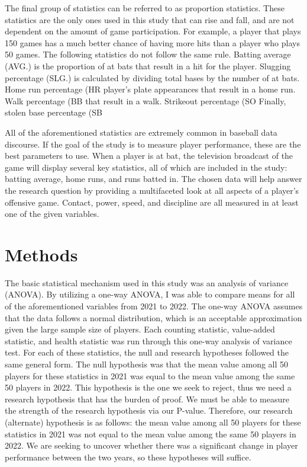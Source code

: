 \documentclass[10pt]{article}
\begin{document}
The final group of statistics can be referred to as proportion statistics. These statistics are the only ones used in this 
study that can rise and fall, and are not dependent on the amount of game participation. For example, a player that plays 150 
games has a much better chance of having more hits than a player who plays 50 games. The following statistics do not follow 
the same rule. Batting average (AVG.) is the proportion of at bats that result in a hit for the player. Slugging percentage 
(SLG.) is calculated by dividing total bases by the number of at bats. Home run percentage (HR%
player’s plate appearances that result in a home run. Walk percentage (BB%
that result in a walk. Strikeout percentage (SO%
Finally, stolen base percentage (SB%

All of the aforementioned statistics are extremely common in baseball data discourse. If the goal of the study is to measure 
player performance, these are the best parameters to use. When a player is at bat, the television broadcast of the game will 
display several key statistics, all of which are included in the study: batting average, home runs, and runs batted in. The 
chosen data will help answer the research question by providing a multifaceted look at all aspects of a player’s offensive 
game. Contact, power, speed, and discipline are all measured in at least one of the given variables.

\section{Methods}

The basic statistical mechanism used in this study was an analysis of variance (ANOVA). By utilizing a one-way ANOVA, I was able to 
compare means for all of the aforementioned variables from 2021 to 2022. The one-way ANOVA assumes that the data follows a 
normal distribution, which is an acceptable approximation given the large sample size of players. Each counting statistic, 
value-added statistic, and health statistic was run through this one-way analysis of variance test. For each of these 
statistics, the null and research hypotheses followed the same general form. The null hypothesis was that the mean value 
among all 50 players for these statistics in 2021 was equal to the mean value among the same 50 players in 2022. This 
hypothesis is the one we seek to reject, thus we need a research hypothesis that has the burden of proof. We must be able 
to measure the strength of the research hypothesis via our P-value. Therefore, our research (alternate) hypothesis is as 
follows: the mean value among all 50 players for these statistics in 2021 was not equal to the mean value among the same 50 
players in 2022. We are seeking to uncover whether there was a significant change in player performance between the two years, 
so these hypotheses will suffice. 
\end{document}
